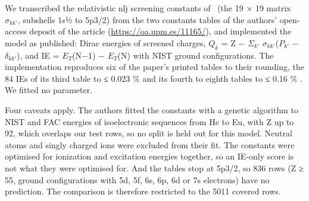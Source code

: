 \documentclass[aps,pra,preprint,notitlepage,superscriptaddress,amsmath,amssymb]{revtex4-2}
\begin{document}
We transcribed the relativistic nlj screening constants of~\cite{r16} (the 19 × 19 matrix $σ_{kk′}$, subshells 1s½ to 5p3/2) from the two constants tables of the authors' open-access deposit of the article (\url{https://oa.upm.es/11165/}), and implemented the model as published: Dirac energies of screened charges, $Q_{k}$ = Z − $Σ_{k′}$ $σ_{kk′}$($P_{k′}$ − $δ_{kk′}$), and IE = $E_{T}$(N−1) − $E_{T}$(N) with NIST ground configurations. The implementation reproduces six of the paper's printed tables to their rounding, the 84 IEs of its third table to ≤ 0.023 \% and its fourth to eighth tables to ≤ 0.16 \% . We fitted no parameter.


Four caveats apply. The authors fitted the constants with a genetic algorithm to NIST and FAC energies of isoelectronic sequences from He to Eu, with Z up to 92, which overlaps our test rows, so no split is held out for this model. Neutral atoms and singly charged ions were excluded from their fit. The constants were optimised for ionization and excitation energies together, so an IE-only score is not what they were optimised for. And the tables stop at 5p3/2, so 836 rows (Z ≥ 55, ground configurations with 5d, 5f, 6s, 6p, 6d or 7s electrons) have no prediction. The comparison is therefore restricted to the 5011 covered rows.
\end{document}
